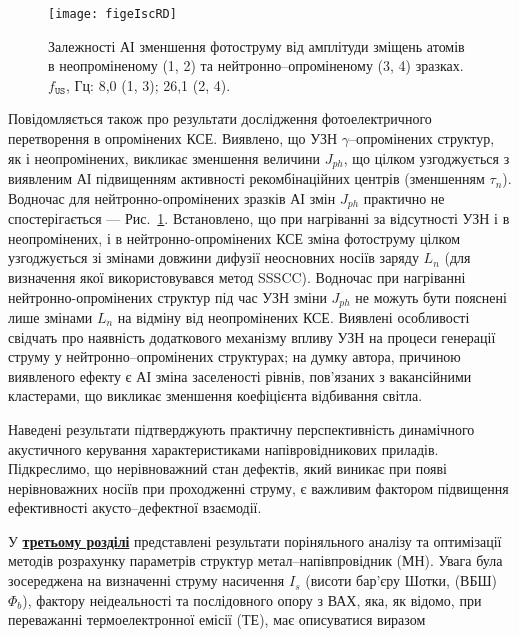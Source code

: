 \documentclass[a5paper,10pt,twoside,openany,article]{memoir} %
\begin{document}
\begin{figure}[ht]
\center
\texttt{[image: figeIscRD]}
\caption{\label{figeIscRD}
Залежності АІ зменшення фотоструму від
амплітуди зміщень атомів в неопроміненому (1, 2)
та нейтронно--опроміненому (3, 4) зразках.
$f_\mathtt{US}$, Гц: 8,0 (1, 3);
26,1 (2, 4).
}%
\end{figure}
Повідомляється також про результати дослідження фотоелектричного перетворення в опромінених КСЕ.
Виявлено, що УЗН $\gamma$--опромінених структур, як і неопромінених, викликає зменшення величини $J_{ph}$, що цілком
узгоджується з виявленим АІ підвищенням активності рекомбінаційних центрів (зменшенням $\tau_n$).
Водночас для нейтронно-опромінених зразків АІ змін $J_{ph}$ практично не спостерігається --- Рис.~\ref{figeIscRD}.
Встановлено, що при нагріванні за відсутності УЗН і в неопромінених, і в нейтронно-опромінених КСЕ зміна фотоструму
цілком узгоджується зі змінами довжини дифузії неосновних носіїв заряду $L_n$ (для визначення якої використовувався метод SSSCC).
Водночас при нагріванні нейтронно-опромінених структур під час УЗН зміни $J_{ph}$ не можуть бути пояснені лише змінами $L_n$ на відміну від неопромінених КСЕ.
Виявлені особливості свідчать про наявність додаткового механізму впливу УЗН на процеси генерації струму у нейтронно--опромінених структурах;
на думку автора, причиною виявленого ефекту є АІ зміна заселеності рівнів, пов'язаних з вакансійними кластерами, що викликає зменшення коефіцієнта відбивання світла.


Наведені   результати  підтверджують  практичну перспективність динамічного акустичного керування характеристиками напівровідникових приладів.
Підкреслимо, що нерівноважний стан дефектів, який виникає при появі нерівноважних носіїв при проходженні струму, є важливим фактором підвищення ефективності акусто--дефектної взаємодії.

У  \underline{\textbf{третьому розділі}} представлені результати поріняльного аналізу та оптимізації методів розрахунку параметрів структур метал--напівпровідник (МН).
Увага була зосереджена на визначенні струму насичення  $I_s$ (висоти бар'єру Шотки, (ВБШ) $\Phi_b$), фактору неідеальності та послідовного опору з ВАХ, яка, як відомо, при переважанні термоелектронної емісії (ТЕ), має описуватися виразом
\end{document}
